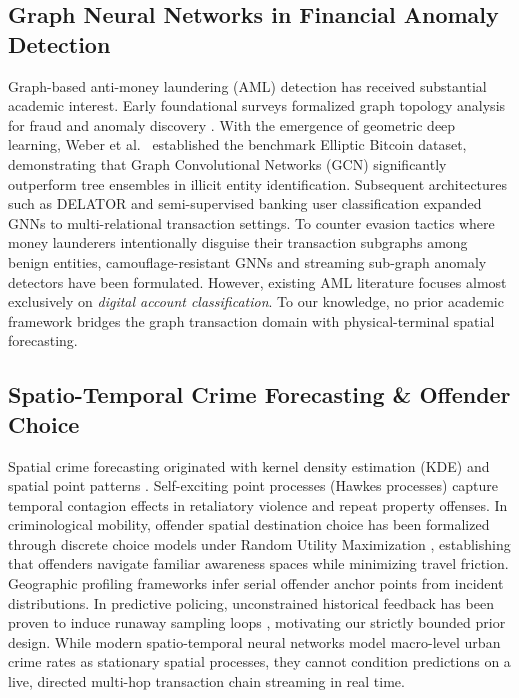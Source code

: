 \documentclass[conference]{IEEEtran}
\begin{document}
\subsection{Graph Neural Networks in Financial Anomaly Detection}
Graph-based anti-money laundering (AML) detection has received substantial academic interest. Early foundational surveys formalized graph topology analysis for fraud and anomaly discovery \cite{akoglu2015}. With the emergence of geometric deep learning, Weber et al.~\cite{weber2019} established the benchmark Elliptic Bitcoin dataset, demonstrating that Graph Convolutional Networks (GCN) significantly outperform tree ensembles in illicit entity identification. Subsequent architectures such as DELATOR \cite{assumpção2022} and semi-supervised banking user classification \cite{wang2019} expanded GNNs to multi-relational transaction settings. To counter evasion tactics where money launderers intentionally disguise their transaction subgraphs among benign entities, camouflage-resistant GNNs \cite{dou2020} and streaming sub-graph anomaly detectors \cite{eswaran2018} have been formulated. However, existing AML literature focuses almost exclusively on \textit{digital account classification}. To our knowledge, no prior academic framework bridges the graph transaction domain with physical-terminal spatial forecasting.

\subsection{Spatio-Temporal Crime Forecasting \& Offender Choice}
Spatial crime forecasting originated with kernel density estimation (KDE) and spatial point patterns \cite{chainey2008, adepeju2016}. Self-exciting point processes (Hawkes processes) \cite{mohler2011} capture temporal contagion effects in retaliatory violence and repeat property offenses. In criminological mobility, offender spatial destination choice has been formalized through discrete choice models under Random Utility Maximization \cite{mcfadden1974, train2009}, establishing that offenders navigate familiar awareness spaces \cite{brantingham1993, bernasco2005} while minimizing travel friction. Geographic profiling frameworks \cite{rossmo2000, canter1993} infer serial offender anchor points from incident distributions. In predictive policing, unconstrained historical feedback has been proven to induce runaway sampling loops \cite{ensign2018}, motivating our strictly bounded prior design. While modern spatio-temporal neural networks model macro-level urban crime rates as stationary spatial processes, they cannot condition predictions on a live, directed multi-hop transaction chain streaming in real time.
\end{document}
